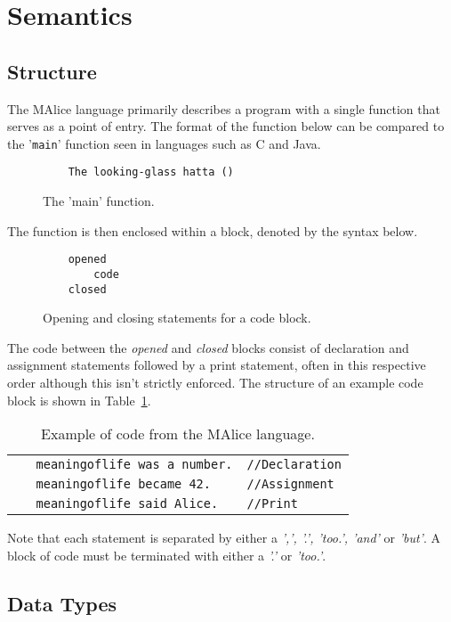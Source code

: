 \documentclass[a4wide, 10pt]{article}
\begin{document}
\section{Semantics}
\subsection{Structure}
The MAlice language primarily describes a program with a single function 
that serves as a point of entry. The format of the function below can be
compared to the '\texttt{main}' function seen in languages such as C and Java.

\begin{figure}[h!]
\begin{verbatim}
    The looking-glass hatta ()
\end{verbatim}
\caption{The 'main' function.}
\end{figure}

The function is then enclosed within a block, denoted by the syntax below.
\begin{figure}[h!]
\begin{verbatim}
    opened
        code
    closed
\end{verbatim}
\caption{Opening and closing statements for a code block.}
\end{figure}

The code between the \emph{opened} and \emph{closed} blocks consist of 
declaration and assignment statements followed by a print statement, 
often in this respective order although this isn't strictly enforced. The 
structure of an example code block is shown in Table~\ref{tab:code}.

\begin{table}[h]
\begin{tabular}{l l}
\verb|   meaningoflife was a number.| & \verb|//Declaration| \\
\verb|   meaningoflife became 42.| & \verb|//Assignment| \\
\verb|   meaningoflife said Alice.| & \verb|//Print| \\
\end{tabular}
\caption{Example of code from the MAlice language.}
\label{tab:code}
\end{table}
  
Note that each statement is separated by either a \emph{',', '.', 'too.',
 'and'} or \emph{'but'}. A block of code must be terminated with either a 
 \emph{'.'} or \emph{'too.'}.

\subsection{Data Types}
\end{document}
